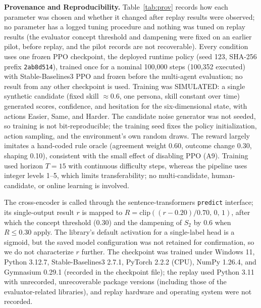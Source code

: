 \documentclass[runningheads,a4paper]{llncs}
\begin{document}
\textbf{Provenance and Reproducibility.} Table~\ref{tab:prov} records how each parameter was chosen and whether it changed after replay results were observed; no parameter has a logged tuning procedure and nothing was tuned on replay results (the evaluator concept threshold and dampening were fixed on an earlier pilot, before replay, and the pilot records are not recoverable). Every condition uses one frozen PPO checkpoint, the deployed runtime policy (seed 123, SHA-256 prefix \texttt{2ab8d514}), trained once for a nominal 100,000 steps (100,352 executed) with Stable-Baselines3 PPO and frozen before the multi-agent evaluation; no result from any other checkpoint is used. Training was SIMULATED: a single synthetic candidate (fixed skill $\approx0.6$, one persona, skill constant over time) generated scores, confidence, and hesitation for the six-dimensional state, with actions Easier, Same, and Harder. The candidate noise generator was not seeded, so training is not bit-reproducible; the training seed fixes the policy initialization, action sampling, and the environment's own random draws. The reward largely imitates a hand-coded rule oracle (agreement weight 0.60, outcome change 0.30, shaping 0.10), consistent with the small effect of disabling PPO (A9). Training used horizon $T=15$ with continuous difficulty steps, whereas the pipeline uses integer levels 1--5, which limits transferability; no multi-candidate, human-candidate, or online learning is involved.

The cross-encoder is called through the sentence-transformers \texttt{predict} interface; its single-output result $r$ is mapped to $R=\mathrm{clip}((r-0.20)/0.70,\,0,\,1)$, after which the concept threshold (0.30) and the dampening of $S_2$ by 0.6 when $R\le0.30$ apply. The library's default activation for a single-label head is a sigmoid, but the saved model configuration was not retained for confirmation, so we do not characterize $r$ further. The checkpoint was trained under Windows 11, Python 3.12.7, Stable-Baselines3 2.7.1, PyTorch 2.2.2 (CPU), NumPy 1.26.4, and Gymnasium 0.29.1 (recorded in the checkpoint file); the replay used Python 3.11 with unrecorded, unrecoverable package versions (including those of the evaluator-related libraries), and replay hardware and operating system were not recorded.
\end{document}
